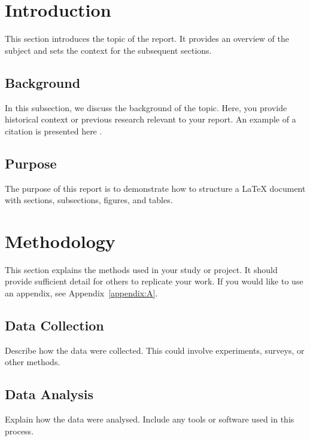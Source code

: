 
\newpage
\section{Introduction}
This section introduces the topic of the report. It provides an overview of the subject and sets the context for the subsequent sections.

\subsection{Background}
In this subsection, we discuss the background of the topic. Here, you provide historical context or previous research relevant to your report. An example of a citation is presented here \cite{smith2023example}.

\subsection{Purpose}
The purpose of this report is to demonstrate how to structure a LaTeX document with sections, subsections, figures, and tables.


\section{Methodology}
This section explains the methods used in your study or project. It should provide sufficient detail for others to replicate your work. If you would like to use an appendix, see Appendix~\ref{appendix:A}.

\subsection{Data Collection}
Describe how the data were collected. This could involve experiments, surveys, or other methods.

\subsection{Data Analysis}
Explain how the data were analysed. Include any tools or software used in this process.


